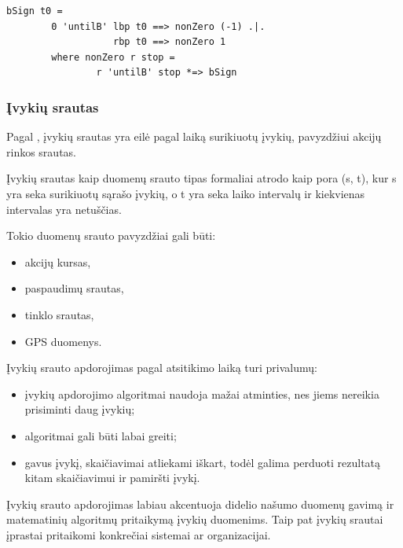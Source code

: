\begin{lstlisting}[caption=- paveiksliuko dydžio modifikavimas pelės paspaudimu, label=grow]
	bSign t0 =
		0 'untilB' lbp t0 ==> nonZero (-1) .|.
				   rbp t0 ==> nonZero 1
		where nonZero r stop =
				r 'untilB' stop *=> bSign
\end{lstlisting}




\subsubsection{Įvykių srautas}

Pagal \cite{Bass:2007:Mythbusters}, įvykių srautas yra eilė pagal laiką surikiuotų įvykių, pavyzdžiui akcijų rinkos srautas.

Įvykių srautas kaip duomenų srauto tipas formaliai atrodo kaip pora (s, t), kur s yra seka surikiuotų sąrašo įvykių, o t yra seka laiko intervalų ir kiekvienas intervalas yra netuščias.

Tokio duomenų srauto pavyzdžiai gali būti:

\begin{itemize}

	\item akcijų kursas,

	\item paspaudimų srautas,

	\item tinklo srautas,

	\item GPS duomenys.

\end{itemize}

Įvykių srauto apdorojimas pagal atsitikimo laiką turi privalumų:

\begin{itemize}

	\item įvykių apdorojimo algoritmai naudoja mažai atminties, nes jiems nereikia prisiminti daug įvykių;

	\item algoritmai gali būti labai greiti;

	\item gavus įvykį, skaičiavimai atliekami iškart, todėl galima perduoti rezultatą kitam skaičiavimui ir pamiršti įvykį.

\end{itemize}

Įvykių srauto apdorojimas labiau akcentuoja didelio našumo duomenų gavimą ir matematinių algoritmų pritaikymą įvykių duomenims. Taip pat įvykių srautai įprastai pritaikomi konkrečiai sistemai ar organizacijai.
